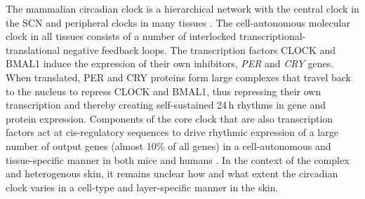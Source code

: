 The mammalian circadian clock is a hierarchical network with the central clock in the SCN and peripheral clocks in many tissues \cite{}. The cell-autonomous molecular clock in all tissues \cite{Takahashi2017, Dibner2010} consists of a number of interlocked transcriptional-translational negative feedback loops. The transcription factors CLOCK and BMAL1 induce the expression of their own inhibitors, \textit{PER} and \textit{CRY} genes. When translated, PER and CRY proteins form large complexes that travel back to the nucleus to repress CLOCK and BMAL1, thus repressing their own transcription and thereby creating self-sustained 24\,h rhythms in gene and protein expression. Components of the core clock that are also transcription factors act at cis-regulatory sequences to drive  rhythmic expression of a large number of output genes (almost 10\% of all genes) in a cell-autonomous and tissue-specific manner in both mice \cite{Zhang2014} and humans \cite{Ruben2018}. In the context of the complex and heterogenous skin, it remains unclear how and what extent the circadian clock varies in a cell-type and layer-specific manner in the skin.


